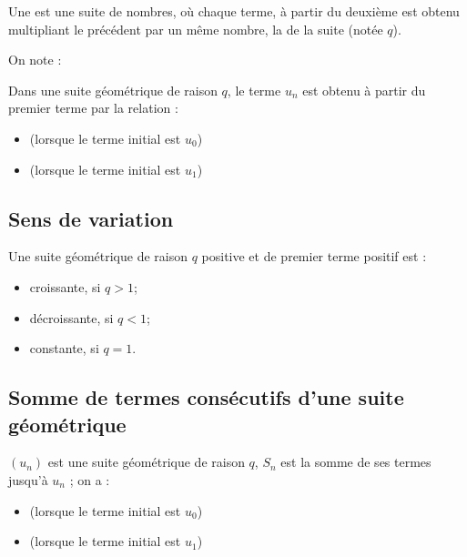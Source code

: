 \documentclass[12pt,a4paper]{article}
\begin{document}
\begin{mybilan}
	
	
	Une  est une suite de nombres, où chaque terme, à partir du deuxième est obtenu multipliant le précédent par un même nombre, la  de la suite (notée $q$).	
	
	On note :
	
	Dans une suite géométrique de raison $q$, le terme $u_n$ est obtenu à partir du premier terme par la relation :
	\begin{itemize}
		\item {} (lorsque le terme initial est $u_0$) 
		\item {} (lorsque le terme initial est $u_1$)
	\end{itemize}
	
%	
\end{mybilan}

\newpage 

\subsection{Sens de variation}

\begin{mybilan}
	Une suite géométrique de raison $q$ positive et de premier terme positif est :
	\begin{itemize}
		\item croissante, si $q > 1$;
		\item décroissante, si $q < 1$;
		\item constante, si $q = 1$.
	\end{itemize}
\end{mybilan}

\subsection{Somme de termes consécutifs d'une suite géométrique}

\begin{mybilan}
	 
	 $(u_n)$ est une suite géométrique de raison $q$, $S_n$ est la somme de ses termes jusqu'à $u_n$ ; on a :
	\begin{itemize}
		\item {} (lorsque le terme initial est $u_0$) 
		\item {} (lorsque le terme initial est $u_1$)
	\end{itemize}
\end{mybilan}
\end{document}
